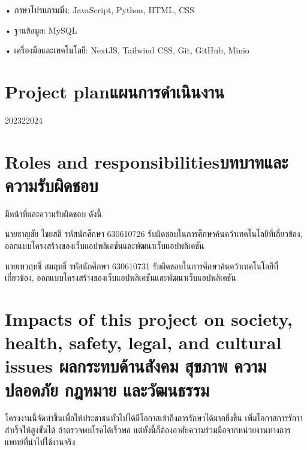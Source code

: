 • ภาษาโปรแกรมมิ่ง: JavaScript, Python, HTML, CSS

• ฐานข้อมูล: MySQL

• เครื่องมือและเทคโนโลยี: NextJS, Tailwind CSS, Git, GitHub, Minio
\section{\ifenglish Project plan\else แผนการดำเนินงาน\fi}

\begin{plan}{11}{2023}{2}{2024}
\end{plan}

\section{\ifenglish Roles and responsibilities\else บทบาทและความรับผิดชอบ\fi}

มีหน้าที่และความรับผิดชอบ ดังนี้

นายชาญชัย ไชยสลี รหัสนักศึกษา 630610726 รับผิดชอบในการศึกษาค้นคว้าเทคโนโลยีที่เกี่ยวข้อง,
ออกแบบโครงสร้างของเว็บแอปพลิเคชันและพัฒนาเว็บแอปพลิเคชัน

นายเทวฤทธิ์ สมฤทธิ์ รหัสนักศึกษา 630610731 รับผิดชอบในการศึกษาค้นคว้าเทคโนโลยีที่เกี่ยวข้อง,
ออกแบบโครงสร้างของเว็บแอปพลิเคชันและพัฒนาเว็บแอปพลิเคชัน


\section{\ifenglish%
Impacts of this project on society, health, safety, legal, and cultural issues
\else%
ผลกระทบด้านสังคม สุขภาพ ความปลอดภัย กฎหมาย และวัฒนธรรม
\fi}

โครงงานนี้จัดทำขึ้นเพื่อให้ประชาชนทั่วไปได้มีโอกาสเข้าถึงการรักษาได้มากยิ่งขึ้น เพิ่มโอกาสการรักาาสำเร็จให้สูงขั้นได้
ถ้าตรวจพบโรคได้เร็วพอ แต่ทั้งนี้ก็ต้องอาศัยความร่วมมือจากหน่วยงานทางการแพทย์ที่นำไปใช้งานจริง
